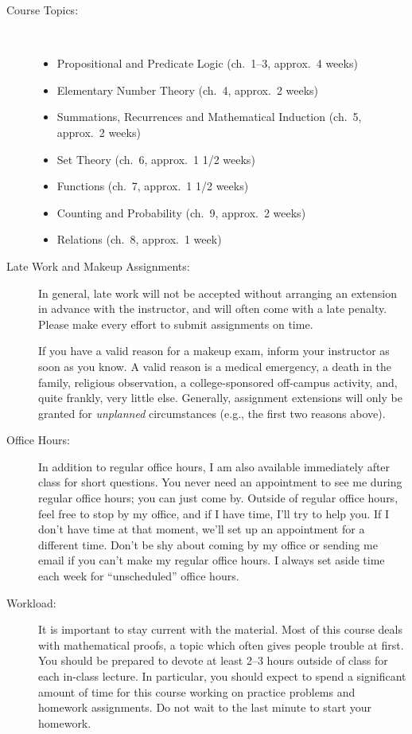 \documentclass [letterpaper,10pt]{article}
\begin{document}
\begin{description}
\item[Course Topics:]\
	\begin{itemize}\setlength{\itemsep}{0em}\setlength{\parskip}{0pt}
		\item Propositional and Predicate Logic (ch.~1--3, approx.~4 weeks)
		\item Elementary Number Theory (ch.~4, approx.~2 weeks)
		\item Summations, Recurrences and Mathematical Induction (ch.~5, approx.~2 weeks)
		\item Set Theory (ch.~6, approx.~1 1/2 weeks)
		\item Functions (ch.~7, approx.~1 1/2 weeks)
		\item Counting and Probability (ch.~9, approx.~2 weeks)
		\item Relations (ch.~8, approx.~1 week)
\end{itemize}

\item[Late Work and Makeup Assignments:]
In general, late work will not be accepted without arranging an extension in advance
with the instructor, and will often come with a late penalty.
Please make every effort to submit assignments on time.

If you have a valid reason for a makeup exam, inform your instructor
   as soon as you know.  A valid reason is a medical emergency, a death in the family, 
   religious observation, a college-sponsored off-campus activity, and, quite frankly, 
   very little else.  Generally, assignment extensions will only be granted for 
   \emph{unplanned} circumstances (e.g., the first two reasons above). 
   


\item[Office Hours:]
In addition to regular office hours, I am also available immediately after class for 
short questions.  You never need an appointment to see me during regular office hours; you
can just come by.  Outside of regular office hours, feel free to stop by my office,
and if I have time, I'll try to help you.  If I don't have time at that moment, we'll set up an
appointment for a different time.
Don't be shy about coming by my office or sending me email
if you can't make my regular office hours.  I always set aside time each week for ``unscheduled'' office hours.

\item[Workload:]
It is important to stay current with the material.  Most of this course deals with
mathematical proofs, a topic which often gives people trouble at first. You should be prepared to devote  at least 2--3 hours outside of class for each in-class lecture.  In particular, you should expect to spend a significant amount of time for this course working on practice problems and homework assignments.	  Do not wait to the last minute to start your homework.





\end{description}
\end{document}
